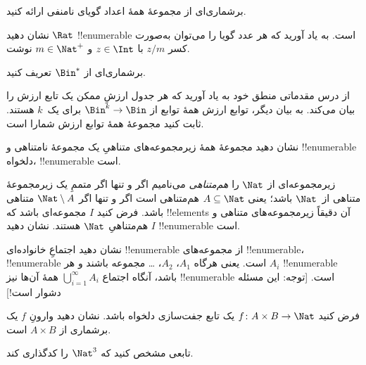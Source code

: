 \documentclass[../../../include/open-logic-section]{subfiles}
\begin{document}
\begin{prob}
برشماری‌ای از مجموعهٔ همهٔ اعداد گویای نامنفی ارائه کنید.
\end{prob}

\begin{prob}
نشان دهید $\Rat$ !!{enumerable} است. به یاد آورید که هر عدد گویا را
می‌توان به‌صورت کسر $z/m$ با $z \in \Int$ و $m \in \Nat^+$ نوشت.
\end{prob}

\begin{prob}
برشماری‌ای از $\Bin^*$ تعریف کنید.
\end{prob}

\begin{prob}
از درس مقدماتی منطق خود به یاد آورید که هر جدول ارزشِ ممکن یک تابع ارزش
را بیان می‌کند. به بیان دیگر، توابع ارزش همهٔ توابع از
$\Bin^k \to \Bin$ برای یک~$k$ هستند. ثابت کنید مجموعهٔ همهٔ توابع ارزش
شمارا است.
\end{prob}

\begin{prob}
نشان دهید مجموعهٔ همهٔ زیرمجموعه‌های متناهیِ یک مجموعهٔ نامتناهی و
!!{enumerable} دلخواه، !!{enumerable} است.
\end{prob}

\begin{prob}
زیرمجموعه‌ای از $\Nat$ را \emph{هم‌متناهی} می‌نامیم اگر و تنها اگر
متممِ یک زیرمجموعهٔ متناهی از~$\Nat$ باشد؛ یعنی $A \subseteq \Nat$
هم‌متناهی است اگر و تنها اگر $\Nat\setminus A$ متناهی باشد. فرض کنید
$I$ مجموعه‌ای باشد که !!{element}s آن دقیقاً زیرمجموعه‌های متناهی و
هم‌متناهیِ $\Nat$ هستند. نشان دهید $I$ !!{enumerable} است.
\end{prob}

\begin{prob}
نشان دهید اجتماعِ خانواده‌ای !!{enumerable} از مجموعه‌های !!{enumerable}،
!!{enumerable} است. یعنی هرگاه $A_1$، $A_2$، \dots{} مجموعه باشند و هر
$A_i$ !!{enumerable} باشد، آنگاه اجتماع $\bigcup_{i=1}^\infty
A_i$ همهٔ آن‌ها نیز !!{enumerable} است. [توجه: این مسئله دشوار است!]
\end{prob}

\begin{prob}
فرض کنید $f \colon A \times B \to \Nat$ یک تابع جفت‌سازی دلخواه باشد.
نشان دهید وارونِ $f$ یک برشماری از $A \times B$ است.
\end{prob}

\begin{prob}
تابعی مشخص کنید که $\Nat^3$ را کدگذاری کند.
\end{prob}
\end{document}
